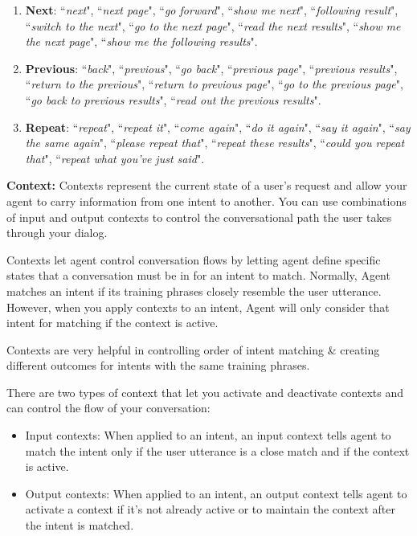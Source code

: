 \documentclass{scrreprt}
\begin{document}
\begin{enumerate}
\begin{enumerate}
        \item \textbf{Next}: ``\textit{next}", ``\textit{next page}", ``\textit{go forward}", ``\textit{show me next}", ``\textit{following result}", ``\textit{switch to the next}", ``\textit{go to the next page}", ``\textit{read the next results}", ``\textit{show me the next page}", ``\textit{show me the following results}".
        \item \textbf{Previous}: ``\textit{back}", ``\textit{previous}", ``\textit{go back}", ``\textit{previous page}", ``\textit{previous results}", ``\textit{return to the previous}", ``\textit{return to previous page}", ``\textit{go to the previous page}", ``\textit{go back to previous results}", ``\textit{read out the previous results}".
        \item \textbf{Repeat}: ``\textit{repeat}", ``\textit{repeat it}", ``\textit{come again}", ``\textit{do it again}", ``\textit{say it again}", ``\textit{say the same again}", ``\textit{please repeat that}", ``\textit{repeat these results}", ``\textit{could you repeat that}", ``\textit{repeat what you've just said}".
    \end{enumerate}
    
\end{enumerate}




\textbf{Context:} Contexts represent the current state of a user's request and allow your agent to carry information from one intent to another. You can use combinations of input and output contexts to control the conversational path the user takes through your dialog.

Contexts let agent control conversation flows by letting agent define specific states that a conversation must be in for an intent to match. Normally, Agent matches an intent if its training phrases closely resemble the user utterance. However, when you apply contexts to an intent, Agent will only consider that intent for matching if the context is active.

Contexts are very helpful in controlling order of intent matching \& creating different outcomes for intents with the same training phrases.

There are two types of context that let you activate and deactivate contexts and can control the flow of your conversation:

\begin{itemize}

\item Input contexts: When applied to an intent, an input context tells agent to match the intent only if the user utterance is a close match and if the context is active.
\item  Output contexts: When applied to an intent, an output context tells agent to activate a context if it's not already active or to maintain the context after the intent is matched.
\end{itemize}
\end{document}
